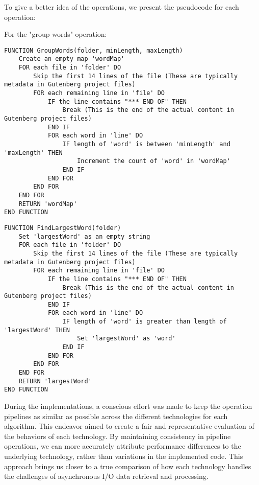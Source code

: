 To give a better idea of the operations, we present the pseudocode for each operation:


For the "group words" operation:



\begin{lstlisting}[language={}, caption={Pseudocode for GroupWords function}, label={lst:groupwords}]
FUNCTION GroupWords(folder, minLength, maxLength)
    Create an empty map 'wordMap'
    FOR each file in 'folder' DO
        Skip the first 14 lines of the file (These are typically metadata in Gutenberg project files)
        FOR each remaining line in 'file' DO
            IF the line contains "*** END OF" THEN
                Break (This is the end of the actual content in Gutenberg project files)
            END IF
            FOR each word in 'line' DO
                IF length of 'word' is between 'minLength' and 'maxLength' THEN
                    Increment the count of 'word' in 'wordMap'
                END IF
            END FOR
        END FOR
    END FOR
    RETURN 'wordMap'
END FUNCTION
\end{lstlisting}

\begin{lstlisting}[language={}, caption={Pseudocode for FindLargestWord function}, label={lst:findlargestword}]
FUNCTION FindLargestWord(folder)
    Set 'largestWord' as an empty string
    FOR each file in 'folder' DO
        Skip the first 14 lines of the file (These are typically metadata in Gutenberg project files)
        FOR each remaining line in 'file' DO
            IF the line contains "*** END OF" THEN
                Break (This is the end of the actual content in Gutenberg project files)
            END IF
            FOR each word in 'line' DO
                IF length of 'word' is greater than length of 'largestWord' THEN
                    Set 'largestWord' as 'word'
                END IF
            END FOR
        END FOR
    END FOR
    RETURN 'largestWord'
END FUNCTION
\end{lstlisting}


During the implementations, a conscious effort was made to keep the operation pipelines as similar as possible across the different technologies for each algorithm. This endeavor aimed to create a fair and representative evaluation of the behaviors of each technology. By maintaining consistency in pipeline operations, we can more accurately attribute performance differences to the underlying technology, rather than variations in the implemented code. This approach brings us closer to a true comparison of how each technology handles the challenges of asynchronous I/O data retrieval and processing.

